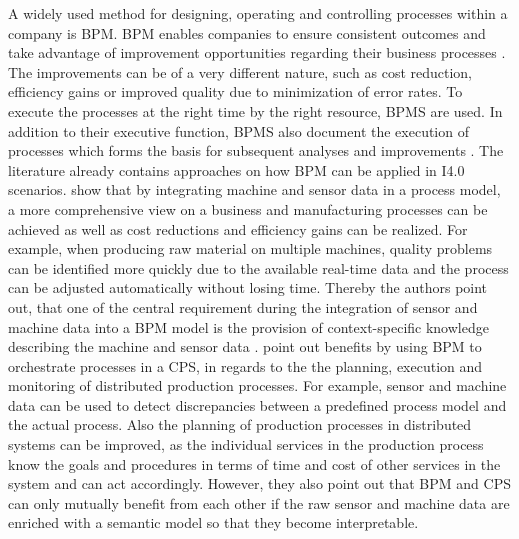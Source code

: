 A widely used method for designing, operating and controlling processes within a company is \ac{BPM}. \ac{BPM} enables companies to ensure consistent outcomes and take advantage of improvement opportunities regarding their business processes \cite[p. 1]{Dumas2018FundamentalManagement}. The improvements can be of a very different nature, such as cost reduction, efficiency gains or improved quality due to minimization of error rates. To execute the processes at the right time by the right resource, \ac{BPMS} are used. In addition to their executive function, \ac{BPMS} also document the execution of processes which forms the basis for subsequent analyses and improvements \cite[p. 345]{Dumas2018FundamentalManagement}. The literature already contains approaches on how BPM can be applied in \ac{I4.0} scenarios. \citet[p. 1444]{Schonig2020IoTExecution} show that by integrating machine and sensor data in a process model, a more comprehensive view on a business and manufacturing processes can be achieved as well as cost reductions and efficiency gains can be realized. For example, when producing raw material on multiple machines, quality problems can be identified more quickly due to the available real-time data and the process can be adjusted  automatically without losing time. Thereby the authors point out, that one of the central requirement during the integration of sensor and machine data into a \ac{BPM} model is the provision of context-specific knowledge describing the machine and sensor data \cite[p. 1447]{Schonig2020IoTExecution}. \citet[p. 2]{Jaenisch2017TheChallenges} point out benefits by using \ac{BPM} to orchestrate processes in a \ac{CPS}, in regards to the the planning, execution and monitoring of distributed production processes. For example, sensor and machine data can be used to detect discrepancies between a predefined process model and the actual process. Also the planning of production processes in distributed systems can be improved, as the individual services in the production process know the goals and procedures in terms of time and cost of other services in the system and can act accordingly. However, they also point out that \ac{BPM} and \ac{CPS} can only mutually benefit from each other if the raw sensor and machine data are enriched with a semantic model so that they become interpretable.    

